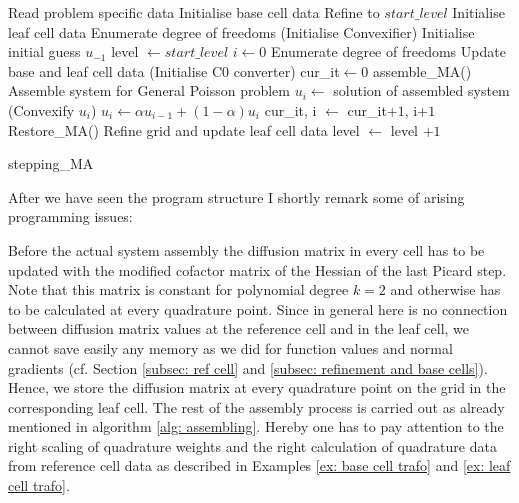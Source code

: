 \begin{algorithm}[H]
\begin{algorithmic}
	\State Read problem specific data
	\State Initialise base cell data
	\State Refine to $start\_level$
	\State Initialise leaf cell data
	\State Enumerate degree of freedoms
	\State (Initialise Convexifier)
	\State Initialise initial guess $u_{-1}$
	\State level $\gets start\_level$
	\State $i \gets 0$
		\State Enumerate degree of freedoms
		\State Update base and leaf cell data
		\State (Initialise C0 converter) 
		\State cur\_it$ \gets 0$
			\State  assemble\_MA()                              \Comment Assemble system for General Poisson problem
			\State $u_i \gets$ solution of assembled system
			\State (Convexify $u_i$)		 
			\State $u_i \gets \alpha u_{i-1}  +(1-\alpha) u_i$
			\State	cur\_it, i $\gets$ cur\_it$+1$, i$+1$
			\State Restore\_MA() 		
		\EndWhile
		\State Refine grid and update leaf cell data
		\State level $\gets$ level $+1$
	\EndWhile
\end{algorithmic}
\caption{stepping\_MA}
\label{alg: stepping}
\end{algorithm}

After we have seen the program structure I shortly remark some of arising programming issues:

Before the actual system assembly the diffusion matrix in every cell has to be updated with the modified cofactor matrix of the Hessian of the last Picard step. Note that this matrix is constant for polynomial degree $k=2$ and otherwise has to be calculated at every quadrature point. Since in general here is no connection between diffusion matrix values at the reference cell and in the leaf cell, we cannot save easily any memory as we did for function values and normal gradients (cf. Section \ref{subsec: ref cell} and \ref{subsec: refinement and base cells}). Hence, we store the diffusion matrix at every quadrature point on the grid in the corresponding leaf cell.
The rest of the assembly process is carried out as already mentioned in algorithm \ref{alg: assembling}. Hereby one has to pay attention to the right scaling of quadrature weights and the right calculation of quadrature data from reference cell data as described in Examples \ref{ex: base cell trafo} and \ref{ex: leaf cell trafo}. 

